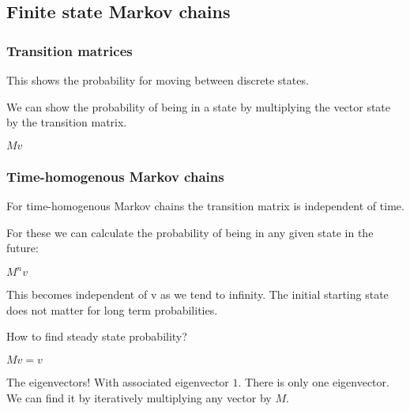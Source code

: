 
\subsection{Finite state Markov chains}

\subsubsection{Transition matrices}

This shows the probability for moving between discrete states.

We can show the probability of being in a state by multiplying the vector state by the transition matrix.

\(Mv\)

\subsubsection{Time-homogenous Markov chains}

For time-homogenous Markov chains the transition matrix is independent of time.

For these we can calculate the probability of being in any given state in the future:

\(M^nv\)

This becomes independent of v as we tend to infinity. The initial starting state does not matter for long term probabilities.

How to find steady state probability?

\(Mv=v\)

The eigenvectors! With associated eigenvector \(1\). There is only one eigenvector. We can find it by iteratively multiplying any vector by \(M\).

